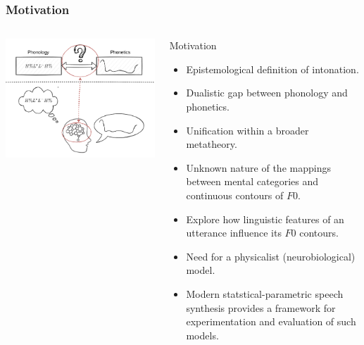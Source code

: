 \documentclass[a4paper,9pt]{beamer}
\theoremstyle{mytheoremstyle}
\begin{document}
\begin{frame}
\frametitle{Motivation}
\begin{columns}
\begin{center}
\includegraphics[width=\textwidth]{res/mapping_highlight.png}
\end{center}
\begin{exampleblock}{Motivation}
\begin{itemize}
\item[\checkmark] Epistemological definition of intonation.
\item[\checkmark] Dualistic gap between phonology and phonetics.
\item[\checkmark] Unification within a broader metatheory.
\item[\checkmark] Unknown nature of the mappings between mental categories and continuous contours of $F0$.
\item[\checkmark] Explore how linguistic features of an utterance influence its $F0$ contours.
\item[\checkmark] Need for a physicalist (neurobiological) model.
\item[\checkmark] Modern statstical-parametric speech synthesis provides a framework for experimentation and evaluation of such models.
\end{itemize}
\end{exampleblock}
\end{columns}
\end{frame}
\end{document}
